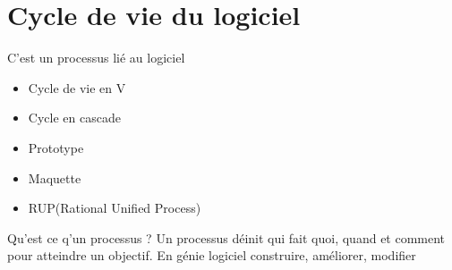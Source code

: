 \documentclass[12pt,a4paper,openany]{book}
\begin{document}
\section{Cycle de vie du logiciel}
C'est un processus lié au logiciel
\begin{itemize}
	\item Cycle de vie en V
	\item Cycle en cascade
	\item Prototype
	\item Maquette
	\item RUP(Rational Unified Process)
\end{itemize}

Qu'est ce q'un processus ? 
Un processus déinit qui fait quoi, quand et comment pour atteindre un objectif.
En génie logiciel construire, améliorer, modifier
\end{document}

